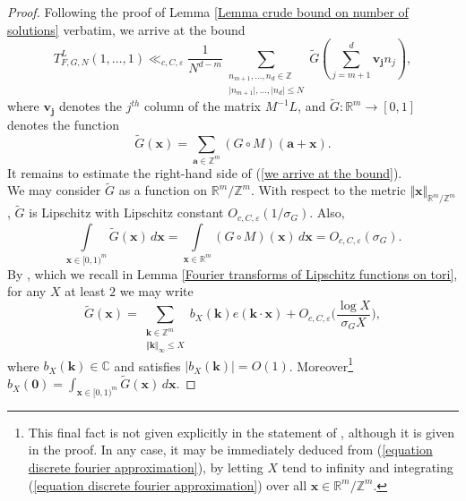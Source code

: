 \documentclass[12pt,a4paper,twoside,reqno]{amsart}
\numberwithin{equation}{section}
\begin{document}
\begin{proof}
Following the proof of Lemma \ref{Lemma crude bound on number of solutions} verbatim, we arrive at the bound 
\begin{equation}
\label{we arrive at the bound}
T_{F,G,N}^L(1,\dots,1) \ll_{c,C,\varepsilon} \frac{1}{N^{d-m}}\sum\limits_{\substack{n_{m+1},\dots,n_d \in \mathbb{Z} \\ \vert n_{m+1}\vert,\dots,\vert n_{d}\vert \leqslant N}} \widetilde{G}(\sum_{j=m+1}^d \mathbf{v_j} n_j),
\end{equation} where $\mathbf{v_j}$ denotes the $j^{th}$ column of the matrix $M^{-1}L$, and $\widetilde{G}:\mathbb{R}^m \longrightarrow [0,1]$ denotes the function \[ \widetilde{G}(\mathbf{x}) = \sum\limits_{\mathbf{a} \in \mathbb{Z}^m} (G\circ M)(\mathbf{a} + \mathbf{x}).\] It remains to estimate the right-hand side of (\ref{we arrive at the bound}). \\

We may consider $\widetilde{G}$ as a function on $\mathbb{R}^m/\mathbb{Z}^m$. With respect to the metric $\Vert \mathbf{x}\Vert_{\mathbb{R}^m/\mathbb{Z}^m}$, $\widetilde{G}$ is Lipschitz with Lipschitz constant $O_{c,C,\varepsilon}(1/\sigma_G)$. Also, \[\int\limits_{\mathbf{x}\in [0,1)^m} \widetilde{G}(\mathbf{x}) \, d\mathbf{x} = \int\limits_{\mathbf{x}\in \mathbb{R}^m} (G \circ M)(\mathbf{x}) \, d\mathbf{x} = O_{c,C,\varepsilon}(\sigma_G).\] By \cite[Lemma A.9]{GrTa08}, which we recall in Lemma \ref{Fourier transforms of Lipschitz functions on tori}, for any $X$ at least $2$ we may write
\begin{equation}
\label{equation discrete fourier approximation}
\widetilde{G}(\mathbf{x}) = \sum\limits_{ \substack{\mathbf{k} \in\mathbb{Z}^m \\ \Vert \mathbf{k} \Vert_\infty \leqslant X}} b_X(\mathbf{k}) e(\mathbf{k} \cdot \mathbf{x}) + O_{c,C,\varepsilon}\Big(\frac{ \log X}{\sigma_G X}\Big),
\end{equation}  where $b_X(\mathbf{k})\in\mathbb{C}$ and satisfies $\vert b_X(\mathbf{k}) \vert = O(1)$. Moreover\footnote{This final fact is not given explicitly in the statement of \cite[Lemma A.9]{GrTa08}, although it is given in the proof. In any case, it may be immediately deduced from (\ref{equation discrete fourier approximation}), by letting $X$ tend to infinity and integrating (\ref{equation discrete fourier approximation}) over all $\mathbf{x} \in \mathbb{R}^m/\mathbb{Z}^m$.} $b_X(\mathbf{0}) = \int_{\mathbf{x} \in [0,1)^m} \widetilde{G}(\mathbf{x}) \, d\mathbf{x}$. 


\end{proof}
\end{document}
